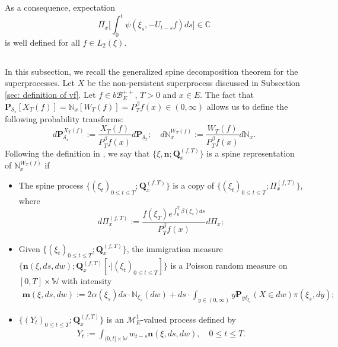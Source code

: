 \documentclass[12pt,oneside,english]{amsart}
\theoremstyle{plain}
\theoremstyle{definition}
\numberwithin{equation}{section}
\begin{document}
    As a consequence, expectation
\[
     \Pi_x\Big[\int_0^t \psi(\xi_s,-U_{t-s}f)ds\Big]
    \in \mathbb C
\]
    is well defined for all $f\in L_2(\xi)$.
\subsection{}
     In this subsection, we recall the generalized spine decomposition theorem for the superprocesses.
    Let $X$ be the non-persistent superprocess discussed in Subsection \ref{sec: definition of vf}.
    Let $f\in b\mathscr B_E^{++}$, $T >0$ and $x\in E$.
    The fact that $\mathbf P_{\delta_x}[X_T(f)] = \mathbb N_x[W_T(f)] = P^\beta_T f(x) \in (0,\infty)$ allows us to define the following probability transforms:
\begin{equation}
    d\mathbf P_{\delta_x}^{X_T(f)}
    := \frac{X_T(f)}{P_T^\beta f(x)} d\mathbf P_{\delta_x};
    \quad d\mathbb N_x^{W_T(f)}
    :=  \frac{W_T(f)}{P_T^\beta f(x)} d\mathbb N_x.
\end{equation}
    Following the definition in \cite{RenSongSun2017Spine}, we say that $\{\xi, \mathbf n;\mathbf Q_{x}^{(f,T)}\}$ is a spine representation of $\mathbb N_x^{W_T(f)}$ if
\begin{itemize}
\item
    The spine process $\{(\xi_t)_{0\leq t\leq T}; \mathbf Q^{(f,T)}_x\}$ is a copy of $\{(\xi_t)_{0\leq t\leq T}; \Pi^{(f,T)}_{x}\}$,
    where
\begin{equation}
    d\Pi_x^{(f,T)} := \frac{f(\xi_T)e^{\int_0^T \beta(\xi_s)ds}}{P^\beta_T f(x)} d \Pi_x;
\end{equation}
\item
    Given $\{(\xi_t)_{0\leq t\leq T}; \mathbf Q^{(f,T)}_x\}$, the immigration measure $\{\mathbf n(\xi,ds,dw); \mathbf Q^{(f,T)}_x[\cdot |(\xi_t)_{0\leq t\leq T}]\}$ is a Poisson random measure on $[0,T] \times \mathbb W$ with intensity
\begin{align}
    \mathbf m(\xi,ds,dw)
    := 2 \alpha(\xi_s) ds \cdot \mathbb N_{\xi_s}(dw) + ds \cdot \int_{y\in (0,\infty)} y \mathbf P_{y\delta_{\xi_s}}(X\in dw) \pi(\xi_s,dy);
\end{align}
\item
    $\{(Y_t)_{0\leq t\leq T}; \mathbf Q^{(f,T)}_x\}$ is an $\mathcal M^1_E$-valued process defined by
\begin{align}
    Y_t
    := \int_{(0,t] \times \mathbb W} w_{t-s} \mathbf n(\xi,ds,dw),
    \quad 0 \leq t\leq T.
\end{align}
\end{itemize}
\end{document}
